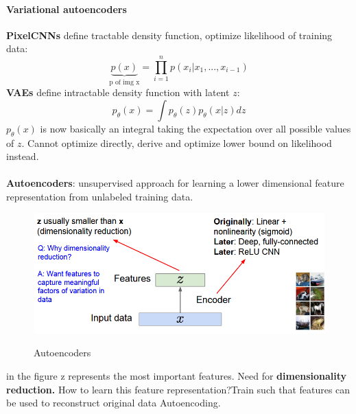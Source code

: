 \documentclass[11pt]{article}
\begin{document}
\paragraph{Variational autoencoders}
\textbf{PixelCNNs} define tractable density function, optimize likelihood of training data:
\begin{equation}
    \underbrace{p(x)}_\text{p of img x}=\prod_{i=1}^{n} p( x_i|x_1,...,x_{i-1})
\end{equation}{}
\textbf{VAEs } define intractable density function with latent $z$:
\begin{equation}
    p_{\theta}(x)=\int     p_{\theta}(z)    p_{\theta}(x|z) dz
\end{equation}{}
$ p_{\theta}(x)$ is now basically an integral taking the expectation over all possible values of $z$.
Cannot optimize directly, derive and optimize lower bound on likelihood instead.\\\\
\textbf{Autoencoders}: unsupervised approach for learning a lower dimensional feature representation from unlabeled training data.
\begin{figure}[h]
\centering
\captionsetup{justification=centering}
\includegraphics[width=0.6\linewidth]{L1215.pdf}
\label{fig:L1215}
\caption{Autoencoders}
\end{figure}
\clearpage
in the figure z represents the most important features. Need for \textbf{dimensionality reduction.} How to learn this feature representation?Train such that features can be used to reconstruct original data Autoencoding.\\
\end{document}

